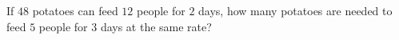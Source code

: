 If $48$ potatoes can feed $12$ people for $2$ days, how many potatoes are needed to feed $5$ people for $3$ days at the same rate?
